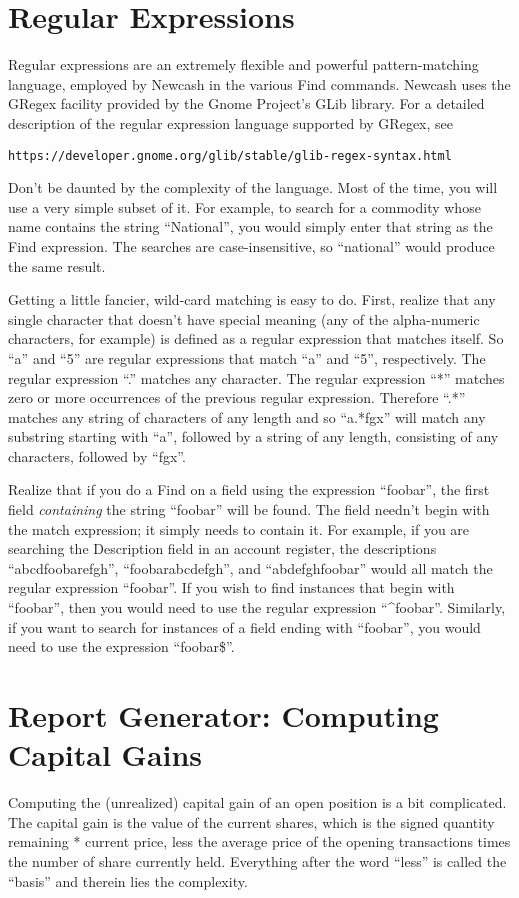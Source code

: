 \documentclass{report}
\begin{document}
\appendix
\chapter{Regular Expressions}
\label{Regular Expressions}
Regular expressions are an extremely flexible and powerful pattern-matching language, employed by Newcash in the various Find commands. Newcash uses the GRegex facility provided by the Gnome Project's GLib library. For a detailed description of the regular expression language supported by GRegex, see
\begin{verbatim}
https://developer.gnome.org/glib/stable/glib-regex-syntax.html
\end{verbatim}

Don't be daunted by the complexity of the language. Most of the time, you will use a very simple subset of it. For example, to search for a commodity whose name contains the string ``National'', you would simply enter that string as the Find expression. The searches are case-insensitive, so ``national'' would produce the same result.

Getting a little fancier, wild-card matching is easy to do. First, realize that any single character that doesn't have special meaning (any of the alpha-numeric characters, for example) is defined as a regular expression that matches itself. So ``a'' and ``5'' are regular expressions that match ``a'' and ``5'', respectively. The regular expression ``.'' matches any character. The regular expression ``*'' matches zero or more occurrences of the previous regular expression. Therefore ``.*'' matches any string of characters of any length and so ``a.*fgx'' will match any substring starting with ``a'', followed by a string of any length, consisting of any characters, followed by ``fgx''.

Realize that if you do a Find on a field using the expression ``foobar'', the first field \emph{containing} the string ``foobar'' will be found. The field needn't begin with the match expression; it simply needs to contain it. For example, if you are searching the Description field in an account register, the descriptions ``abcdfoobarefgh'', ``foobarabcdefgh'', and ``abdefghfoobar'' would all match the regular expression ``foobar''. If you wish to find instances that begin with ``foobar'', then you would need to use the regular expression ``\^{}foobar''. Similarly, if you want to search for instances of a field ending with ``foobar'', you would need to use the expression ``foobar\$''.
\chapter{Report Generator: Computing Capital Gains}
Computing the (unrealized) capital gain of an open position is a bit complicated. The capital gain is the value of the current shares,
which is the signed quantity remaining * current price, less the average price of the opening transactions times the number of share currently held. Everything after the word ``less'' is called the ``basis'' and therein lies the complexity.
\end{document}
